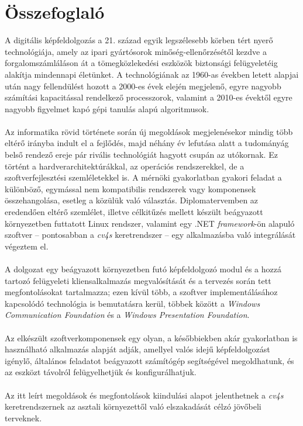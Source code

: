 \chapter*{Összefoglaló}

A digitális képfeldolgozás a 21. század egyik legszélesebb körben tért nyerő technológiája, amely az ipari gyártósorok minőség-ellenőrzésétől kezdve a forgalomszámláláson át a tömegközlekedési eszközök biztonsági felügyeletéig alakítja mindennapi életünket. A technológiának az 1960-as években letett alapjai után nagy fellendülést hozott a 2000-es évek elején megjelenő, egyre nagyobb számítási kapacitással rendelkező processzorok, valamint a 2010-es évektől egyre nagyobb figyelmet kapó gépi tanulás alapú algoritmusok.\\
\\
Az informatika rövid története során új megoldások megjelenésekor mindig több eltérő irányba indult el a fejlődés, majd néhány év lefutása alatt a tudományág belső rendező ereje pár rivális technológiát hagyott csupán az utókornak. Ez történt a hardverarchitektúrákkal, az operációs rendszerekkel, de a szoftverfejlesztési szemléletekkel is. A mérnöki gyakorlatban gyakori feladat a különböző, egymással nem kompatibilis rendszerek vagy komponensek összehangolása, esetleg a közülük való választás. Diplomatervemben az eredendően eltérő szemlélet, illetve célkitűzés mellett készült beágyazott környezetben futtatott Linux rendszer, valamint egy .NET \emph{framework}-ön alapuló szoftver -- pontosabban a \emph{cv4s} keretrendszer -- egy alkalmazásba való integrálását végeztem el.\\
\\
A dolgozat egy beágyazott környezetben futó képfeldolgozó modul és a hozzá tartozó felügyeleti kliensalkalmazás megvalósítását és a tervezés során tett megfontolásokat tartalmazza; ezen kívül több, a szoftver implementálásához kapcsolódó technológia is bemutatásra kerül, többek között a \emph{Windows Communication Foundation} és a \emph{Windows Presentation Foundation}.\\
\\
Az elkészült szoftverkomponensek egy olyan, a későbbiekben akár gyakorlatban is használható alkalmazás alapját adják, amellyel valós idejű képfeldolgozást igénylő, általános feladatot beágyazott számítógép segítségével megoldhatunk, és az eszközt távolról felügyelhetjük és konfigurálhatjuk.\\
\\
Az itt leírt megoldások és megfontolások kiindulási alapot jelenthetnek a \emph{cv4s} keretrendszernek az asztali környezettől való elszakadását célzó jövőbeli terveknek.
